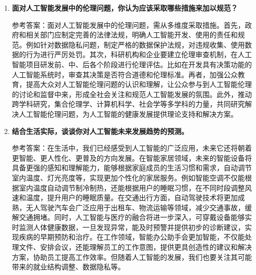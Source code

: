 \begin{enumerate}
\item \textbf{面对人工智能发展中的伦理问题，你认为应该采取哪些措施来加以规范？}

参考答案：面对人工智能发展中的伦理问题，需从多维度采取措施。首先，政府和相关部门应制定完善的法律法规，明确人工智能开发、使用的责任和规范。例如针对数据隐私问题，制定严格的数据保护法规，对违规收集、使用数据的行为进行严厉处罚。其次，科研机构和企业要建立伦理审查机制，在人工智能项目研发前、中、后各个阶段进行伦理评估。比如在开发具有决策功能的人工智能系统时，审查其决策是否符合道德和伦理标准。再者，加强公众教育，提高大众对人工智能伦理问题的认识和理解，让公众参与到人工智能伦理的讨论和监督中来，形成全社会关注和规范人工智能发展的氛围。此外，推动跨学科研究，集合伦理学、计算机科学、社会学等多学科的力量，共同研究解决人工智能伦理问题，为人工智能的健康发展提供理论支持和解决方案。

\item \textbf{结合生活实际，谈谈你对人工智能未来发展趋势的预测。}

参考答案：在生活中，我们已经感受到人工智能的广泛应用，未来它还将朝着更智能、更人性化、更普及的方向发展。在智能家居领域，未来的智能设备将具备更强的感知和理解能力，能够根据家庭成员的生活习惯和需求，自动调节室内温度、灯光亮度等，实现更加个性化的家居服务。例如智能空调不仅能根据室内温度自动调节制冷制热，还能根据用户的睡眠习惯，在不同时段调整风速和温度，提升用户的睡眠质量。在交通出行方面，自动驾驶技术将更加成熟，无人驾驶汽车会广泛应用于出租车、物流运输等领域，减少交通事故，缓解交通拥堵。同时，人工智能与医疗的融合将进一步深入，可穿戴设备能够实时监测人体健康数据，一旦发现异常，能及时预警并提供初步的诊断建议，实现疾病的早期预防和治疗。在工作领域，智能办公助手会更加智能，不仅能处理文件、安排会议，还能理解员工的工作意图，提供更具创造性的建议和解决方案，协助员工提高工作效率。但随着人工智能的发展，我们也要关注其可能带来的就业结构调整、数据隐私等。
\end{enumerate}




